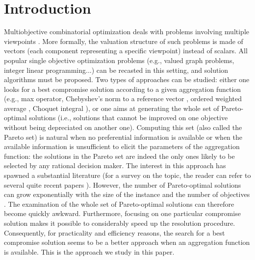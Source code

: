 \documentclass[final,3p,times]{elsarticle}
\begin{document}
\section{Introduction}
\label{intro}
Multiobjective combinatorial optimization deals with problems
involving multiple viewpoints \cite{Ehrgo05}. More formally, the
valuation structure of such problems is made of vectors (each
component representing a specific viewpoint) instead of scalars. All
popular single objective optimization problems (e.g., valued graph
problems, integer linear programming...) can be recasted in this
setting, and solution algorithms must be proposed. Two types of
approaches can be studied: either one looks for a best compromise
solution according to a given aggregation function (e.g., max
operator, Chebyshev's norm to a reference vector \cite{Wierz80},
ordered weighted average \cite{Yager88}, Choquet integral
\cite{Grabi96}), or one aims at generating the whole set of
Pareto-optimal solutions (i.e., solutions that cannot be improved on
one objective without being depreciated on another one). Computing this set (also called
the Pareto set) is natural when no preferential information is available 
or when the available information is unsufficient to elicit the parameters of the aggregation function: the solutions in the Pareto
set are indeed the only ones likely to be selected by any rational
decision maker. The interest in this approach has spawned a
substantial literature (for a survey on the topic, the reader can
refer to several quite recent papers \cite{EhrgG00,EhrgG04}). However,
the number of Pareto-optimal solutions can grow exponentially
with the size of the instance \cite[e.g.][]{HamaR94,Hanse80} and the number
of objectives \cite{Rosin91}. The
examination of the whole set of Pareto-optimal solutions can therefore become
quickly awkward. Furthermore, focusing on one particular compromise solution
makes it possible to considerably speed up the resolution
procedure. Consequently, for practicality and
efficiency reasons, the search for a best compromise solution seems to be a
better approach when an aggregation function is available. This is the approach we study in this paper. 
\end{document}
